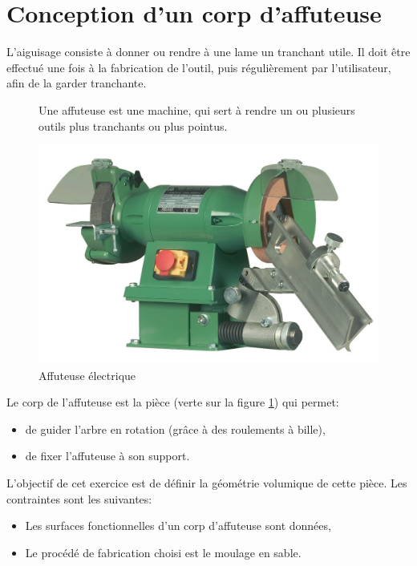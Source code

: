 \newpage

\section{Conception d'un corp d'affuteuse}

L'aiguisage consiste à donner ou rendre à une lame un tranchant utile. Il doit être effectué une fois à la fabrication de l'outil, puis régulièrement par l'utilisateur, afin de la garder tranchante.

\begin{figure}[!h]
 \begin{minipage}{0.45\linewidth}
Une affuteuse est une machine, qui sert à rendre un ou plusieurs outils plus tranchants ou plus pointus.
\end{minipage}
\hfill
 \begin{minipage}{0.5\linewidth}
  \centering\includegraphics[width=1\linewidth]{img/affuteuse.jpg}
  \caption{Affuteuse électrique}
  \label{img:image4}
 \end{minipage}
\end{figure}

Le corp de l'affuteuse est la pièce (verte sur la figure \ref{img:image4}) qui permet:
\begin{itemize}
 \item de guider l'arbre en rotation (grâce à des roulements à bille),
 \item de fixer l'affuteuse à son support. 
\end{itemize}

L'objectif de cet exercice est de définir la géométrie volumique de cette pièce. Les contraintes sont les suivantes:
\begin{itemize}
 \item Les surfaces fonctionnelles d'un corp d'affuteuse sont données,
 \item Le procédé de fabrication choisi est le moulage en sable.
\end{itemize}

